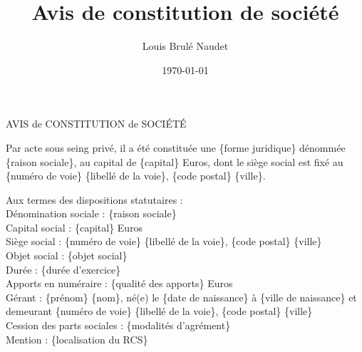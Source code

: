 \documentclass[french, 12pt]{report}
\title{Avis de constitution de société}
\author{Louis Brulé Naudet}
\date{\today}
\begin{document}
\begin{center}
\LARGE{AVIS de CONSTITUTION de SOCIÉTÉ}
\end{center}
\vspace{1cm}

Par acte sous seing privé, il a été constituée une \{{forme juridique}\} dénommée \{{raison sociale}\}, au capital de \{{capital}\} Euros, dont le siège social est fixé au \{{numéro de voie}\} \{{libellé de la voie}\}, \{{code postal}\} \{{ville}\}.\par 

Aux termes des dispositions statutaires :\\
Dénomination sociale : \{{raison sociale}\}\\
Capital social : \{{capital}\} Euros\\
Siège social : \{{numéro de voie}\} \{{libellé de la voie}\}, \{{code postal}\} \{{ville}\}\\
Objet social : \{{objet social}\}\\
Durée : \{{durée d'exercice}\}\\
Apports en numéraire : \{{qualité des apports}\} Euros\\
Gérant : \{{prénom}\} \{{nom}\}, né(e) le \{{date de naissance}\} à \{{ville de naissance}\} et demeurant \{{numéro de voie}\} \{{libellé de la voie}\}, \{{code postal}\} \{{ville}\}\\
Cession des parts sociales : \{{modalités d'agrément}\}\\
Mention : \{{localisation du RCS}\}
\end{document}

